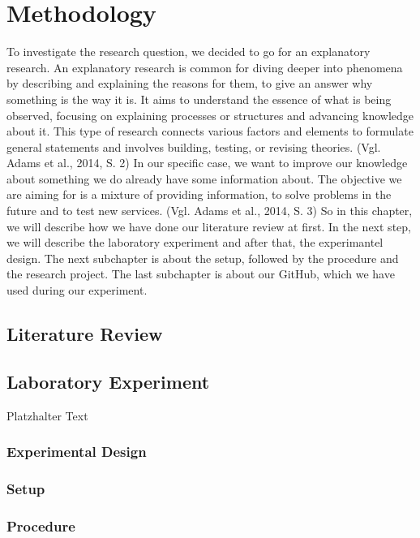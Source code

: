 \newpage

\section{Methodology} \label{methodology}
To investigate the research question, we decided to go for an explanatory research. An explanatory research is common for diving deeper into phenomena by describing and explaining the reasons for them, to give an answer why something is the way it is.  It aims to understand the essence of what is being observed, focusing on explaining processes or structures and advancing knowledge about it. This type of research connects various factors and elements to formulate general statements and involves building, testing, or revising theories. (Vgl. Adams et al., 2014, S. 2)
In our specific case, we want to improve our knowledge about something we do already have some information about. The objective we are aiming for is a mixture of providing information, to solve problems in the future and to test new services. (Vgl. Adams et al., 2014, S. 3)
So in this chapter, we will describe how we have done our literature review at first. In the next step, we will describe the laboratory experiment and after that, the experimantel design. The next subchapter is about the setup, followed by the procedure and the research project.
The last subchapter is about our GitHub, which we have used during our experiment. 
\subsection{Literature Review} \label{literature_review}

\subsection{Laboratory Experiment} \label{laboratory_experiment}
Platzhalter Text
\subsubsection{Experimental Design} \label{experimental_design}

\subsubsection{Setup} \label{setup}

\subsubsection{Procedure} \label{procedure}


